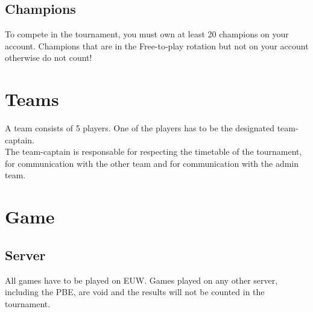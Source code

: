 \documentclass{article}
\begin{document}
\subsection{Champions}
To compete in the tournament, you must own at least 20 champions on your account. Champions that are in the Free-to-play rotation but not on your account otherwise do not count!


\section{Teams}
A team consists of 5 players. One of the players has to be the designated team-captain.
\\
The team-captain is responsable for respecting the timetable of the tournament, for communication with the other team and for communication with the admin team.

\section{Game}
\subsection{Server}
All games have to be played on EUW. Games played on any other server, including the PBE, are void and the results will not be counted in the tournament.
\end{document}
